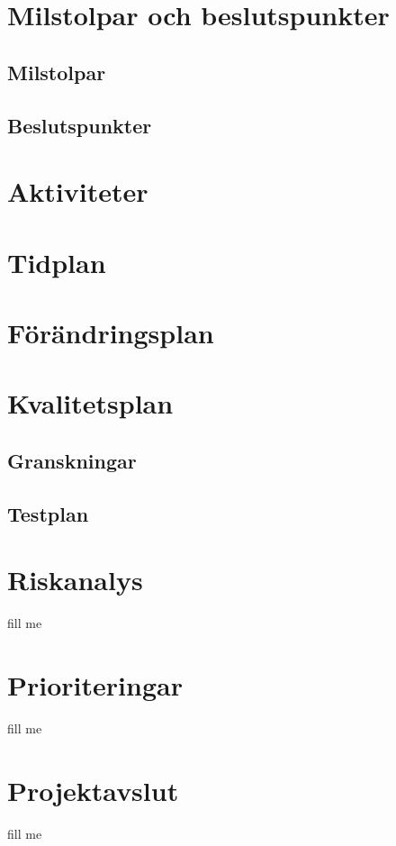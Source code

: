 \documentclass[projektplan/plan.tex]{subfiles}
\begin{document}
\section{Milstolpar och beslutspunkter}
\subsection{Milstolpar}
\subsection{Beslutspunkter}

\section{Aktiviteter}

\section{Tidplan}

\section{Förändringsplan}

\section{Kvalitetsplan}
\subsection{Granskningar}
\subsection{Testplan}


\section{Riskanalys}
fill me

\section{Prioriteringar}
fill me

\section{Projektavslut}
fill me
\end{document}
